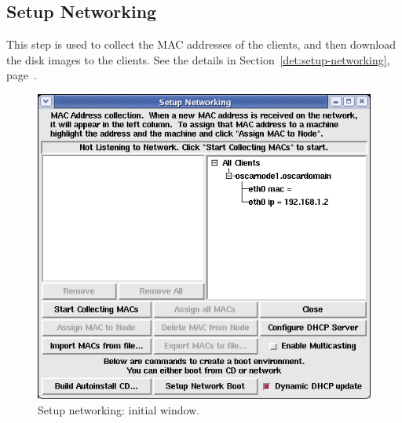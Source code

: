 
\subsection{Setup Networking}

This step is used to collect the MAC addresses of the clients, and
then download the disk images to the clients.  See the details in
Section~\ref{det:setup-networking},
page~\pageref{det:setup-networking}.

\begin{figure}[!ht]
  \begin{center}
    \centerline{\includegraphics[scale=\imgscale]{figs/6a_sbs-collect-mac1}}
    \caption{Setup networking: initial window.}
    \label{fig:sbs-setup-network1}
  \end{center}
\end{figure}


